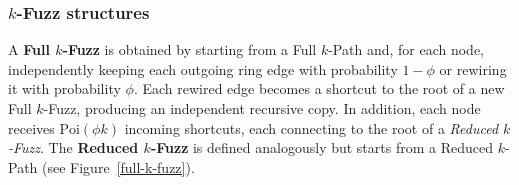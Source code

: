 \documentclass[10pt]{amsart}
\begin{document}

\subsubsection*{\( k \)-Fuzz structures} 
A \textbf{Full $k$-Fuzz} is obtained by starting from a Full $k$-Path and, for each node, independently keeping each outgoing ring edge with probability $1-\phi$ or rewiring it with probability $\phi$. 
Each rewired edge becomes a shortcut to the root of a new Full $k$-Fuzz, producing an independent recursive copy. 
In addition, each node receives $\text{Poi}(\phi k)$ incoming shortcuts, each connecting to the root of a \emph{Reduced $k$-Fuzz}. 
The \textbf{Reduced $k$-Fuzz} is defined analogously but starts from a Reduced $k$-Path (see Figure~\ref{full-k-fuzz}).
\end{document}
